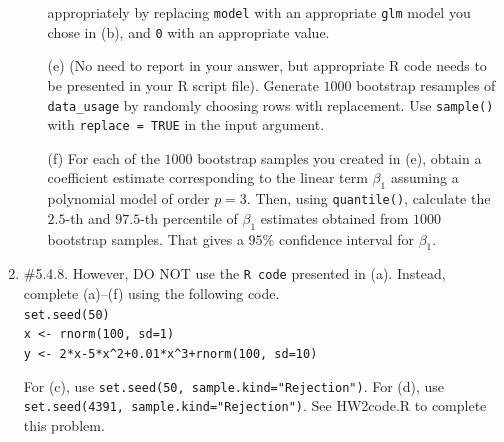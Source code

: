 \documentclass[12pt]{article}
\begin{document}
\begin{enumerate}
\begin{itemize}
appropriately by replacing {\tt model} with an appropriate {\tt glm} model you chose in (b), and {\tt 0} with an appropriate value.\\
\item[(e)] (No need to report in your answer, but appropriate R code needs to be presented in your R script file). Generate $1000$ bootstrap resamples of {\tt data\_usage} by randomly choosing rows with replacement. Use {\tt sample()} with {\tt replace = TRUE} in the input argument.
\item[(f)] For each of the $1000$ bootstrap samples you created in (e), obtain a coefficient estimate corresponding to the linear term $\beta_1$ assuming a polynomial model of order $p = 3$. Then, using {\tt quantile()}, calculate the $2.5$-th and $97.5$-th percentile of $\beta_1$ estimates obtained from $1000$ bootstrap samples. That gives a $95\%$ confidence interval for $\beta_1$.
\end{itemize}

\item  \#5.4.8. However, DO NOT use the {\tt R code} presented in (a). Instead, complete (a)--(f) using the following code.\\

{\tt set.seed(50)\\
x <- rnorm(100, sd=1)\\
y <- 2*x-5*x\string^2+0.01*x\string^3+rnorm(100, sd=10)\\}

For (c), use {\tt set.seed(50, sample.kind="Rejection")}. For (d), use {\tt set.seed(4391, sample.kind="Rejection")}. See HW2code.R to complete this problem.

\end{enumerate}
\end{document}
